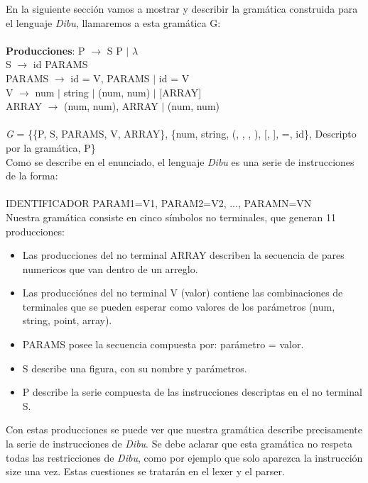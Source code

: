 En la siguiente sección vamos a mostrar y describir la gramática construida para el lenguaje \textit{Dibu}, llamaremos a esta
gramática G:\\
\\
\textbf{Producciones}:
\newline
P $\rightarrow$ S P $\mid$ $\lambda$\\
S $\rightarrow$ id PARAMS\\
PARAMS $\rightarrow$  id = V, PARAMS $\mid$ id = V\\
V $\rightarrow$ num $\mid$ string $\mid$ (num, num) $\mid$ [ARRAY]\\
ARRAY $\rightarrow$ (num, num), ARRAY $\mid$ (num, num)\\
\\
\textit{G} = \{\{P, S, PARAMS, V, ARRAY\}, \{num, string, (, , , ), [, ], =, id\}, Descripto por la gramática, P\}\\

Como se describe en el enunciado, el lenguaje \textit{Dibu} es una serie de instrucciones de la forma:\\
\\
IDENTIFICADOR PARAM1=V1, PARAM2=V2, ..., PARAMN=VN\\

Nuestra gramática consiste en cinco s\'imbolos no terminales, que generan 11 producciones:
\begin{itemize}
	\item Las producciones del no terminal ARRAY describen la secuencia de pares numericos que van dentro de un arreglo.
	\item Las producciónes del no terminal V (valor) contiene las combinaciones de terminales que se pueden esperar como valores de los parámetros (num, string, point, array).
	\item PARAMS posee la secuencia compuesta por: parámetro = valor.
	\item S describe una figura, con su nombre y parámetros.
	\item P describe la serie compuesta de las instrucciones descriptas en el no terminal S.
\end{itemize}

Con estas producciones se puede ver que nuestra gramática describe precisamente la serie de instrucciones de \textit{Dibu}. Se debe
aclarar que esta gramática no respeta todas las restricciones de \textit{Dibu}, como por ejemplo que solo aparezca la
instrucción size una vez. Estas cuestiones se tratarán en el lexer y el parser.\\

